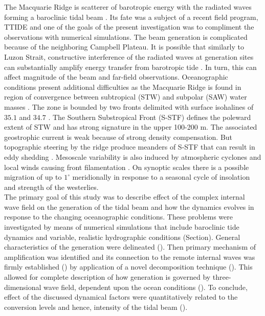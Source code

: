 \documentclass[12pt]{article}
\begin{document}
The Macquarie Ridge is scatterer of barotropic energy with the radiated waves forming a baroclinic 
tidal beam \citep{zhao2016global, zhao2018satellite}. Its fate was a subject of a recent field 
program, TTIDE \citep{pinkel2015breaking} and one of the goals of the present investigation 
was to compliment the observations with numerical simulations. The beam generation is complicated 
because of the neighboring Campbell Plateau. It is possible that similarly to Luzon Strait, 
constructive interference of the radiated waves at generation sites can substantially amplify 
energy transfer from barotropic tide \citep{buijsman2012double, echeverri2010internal}. In turn, 
this can affect magnitude of the beam and far-field observations. Oceanographic conditions present 
additional difficulties as the Macquarie Ridge is found in region of convergence between 
subtropical (STW) and 
subpolar (SAW) water masses 
\citep{chiswell2015physical}. 
The zone is bounded by two fronts delimited with surface isohalines of $35.1$ and $34.7$ 
\citep{belkin, hamilton} . The Southern Substropical Front 
(S-STF) defines the poleward extent of STW and has strong signature in the upper 100-200 m. The 
associated geostrophic current is weak because of strong density compensation. But topographic 
steering by the ridge produce meanders of S-STF that can result in eddy shedding 
\citep{smith2013interaction}. Mesoscale variability is also induced by atmospheric cyclones and 
local winds causing front filamentation \citep{james}. On synoptic scales there is a possible 
migration of up to $1^{\circ}$ meridionally \citep{smith} in response to a seasonal cycle of 
insolation and strength of the westerlies.\\

The primary goal of this study was to describe effect of the complex internal wave field on the 
generation of the tidal beam and how the dynamics evolves in response to the changing oceanographic 
conditions. These problems were investigated by means of numerical simulations that include 
baroclinic tide dynamics and variable, realistic hydrographic conditions (Section). General 
characteristics of the generation were delineated (). Then primary mechanism of amplification was 
identified and its connection to the remote internal waves was firmly established () by application 
of a novel decomposition technique (). This allowed for complete description of how generation 
is governed by three-dimensional wave field, dependent upon the ocean conditions (). To conclude, 
effect of the discussed dynamical factors were quantitatively related to the conversion levels and 
hence, intensity of the tidal beam ().\\
 
\end{document}
